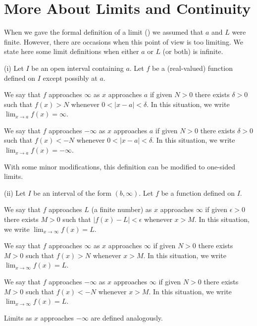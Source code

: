 \section{More About Limits and Continuity}{}{}

When we gave the formal definition of a limit () we
assumed that $a$ and $L$ were finite. However, there are occasions
when this point of view is too limiting. We state here some limit
definitions when either $a$ or $L$ (or both) is infinite.

\begin{definition} \relax (i) Let $I$ be an open interval containing $a$. Let $f$ be a
(real-valued) function defined on $I$ except possibly at $a$.

We say that $f$ approaches $\infty $ as $x$ approaches $a$ if given
$N>0 $ there exists $\delta >0 $ such that $f(x) >N$ whenever $0<
|x-a| < \delta $.  In this situation, we write $\displaystyle{\lim
_{x\rightarrow a} f(x) }=\infty $.

We say that $f$ approaches $-\infty $ as $x$ approaches $a$ if given
 $N>0 $ there exists $\delta >0 $ such that $f(x) <-N $ whenever
 $0<|x-a| < \delta $. In this situation, we write $\displaystyle{\lim
 _{x\rightarrow a} f(x) }=-\infty $.


With some minor modifications, this definition can be modified to
one-sided limits.

 (ii) Let $I$ be an interval of the form $(b,\infty ) $. Let $f$ be a
 function defined on $I$.

 We say that $f$ approaches $L$ (a finite number) as $x$ approaches
  $\infty $ if given $\epsilon >0 $ there exists $M>0 $ such that
  $|f(x) -L |< \epsilon $ whenever $x>M $.  In this situation, we
  write $\displaystyle{\lim _{x\rightarrow \infty } f(x) }=L $.

We say that $f$ approaches $\infty $ as $x$ approaches $\infty $ if
  given $N >0 $ there exists $M>0 $ such that $f(x) > N $ whenever
  $x>M $.  In this situation, we write $\displaystyle{\lim
  _{x\rightarrow \infty } f(x) }=L $.

 We say that $f$ approaches $-\infty $ as $x$ approaches $\infty $ if
  given $N >0 $ there exists $M>0 $ such that $ f(x) < -N$ whenever
  $x>M $.  In this situation, we write $\displaystyle{\lim
  _{x\rightarrow \infty } f(x) }=L $.

 Limits as $x$ approaches $-\infty $ are defined analogously.

\end{definition}
\label{def:extended limits}

